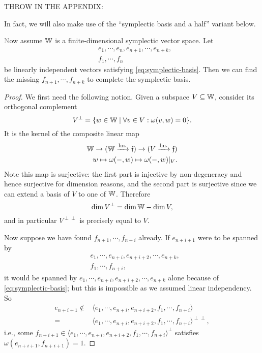 \color{gray}THROW IN THE APPENDIX: 

In fact, we will also make use of the ``symplectic basis and a half'' variant below. 
\begin{proposition}\label{prop:symplectic-basis-and-a-half}\textcolor{gray}
    Now assume $\mathbb{W}$ is a finite-dimensional symplectic vector space.
    Let 
    \begin{align*} 
        &e_1, \cdots, e_n, e_{n+1}, \cdots, e_{n+k}, \\
        &f_1, \cdots, f_n
    \end{align*}
    be linearly independent vectors satisfying \eqref{eq:symplectic-basis}.
    Then we can find the missing $f_{n+1}, \cdots, f_{n+k}$ to complete the symplectic basis.
\end{proposition}
\begin{proof}
    We first need the following notion.
    Given a subspace $V \subseteq \mathbb{W}$, consider its orthogonal complement
    \[
        V^\perp = \{ w \in \mathbb{W} \mid \forall v \in V : \omega(v, w) = 0 \}.
    \]
    It is the kernel of the composite linear map 
    \begin{align*}
        \mathbb{W} \to (\mathbb{W} \xrightarrow{\text{lin.}} \mathfrak{f}) \to (V \xrightarrow{\text{lin.}} \mathfrak{f}) \\
        w \mapsto \omega(-, w) \mapsto \omega(-, w)|_V.
    \end{align*}
    Note this map is surjective:
    the first part is injective by non-degeneracy and hence surjective for dimension reasons,
    and the second part is surjective since we can extend a basis of $V$ to one of $\mathbb{W}$.
    Therefore 
    \[
        \dim V^\perp = \dim \mathbb{W} - \dim V,
    \]
    and in particular $V^{\perp \perp}$ is precisely equal to $V$.

    Now suppose we have found $f_{n+1}, \cdots, f_{n+i}$ already.
    If $e_{n+i+1}$ were to be spanned by 
    \begin{align*}
        &e_1, \cdots, e_{n+i}, e_{n+i+2}, \cdots, e_{n+k},\\ 
        &f_1, \cdots, f_{n+i},
    \end{align*}
    it would be spanned by $e_1, \cdots, e_{n+i}, e_{n+i+2}, \cdots, e_{n+k}$ alone because of \eqref{eq:symplectic-basis};
    but this is impossible as we assumed linear independency.
    So 
    \begin{align*}
        e_{n+i+1} 
        \not\in{} &\langle e_1, \cdots, e_{n+i}, e_{n+i+2}, f_1, \cdots, f_{n+i} \rangle \\
        ={} &\langle e_1, \cdots, e_{n+i}, e_{n+i+2}, f_1, \cdots, f_{n+i} \rangle^{\perp \perp},
    \end{align*}
    i.e., some $f_{n+i+1} \in \langle e_1, \cdots, e_{n+i}, e_{n+i+2}, f_1, \cdots, f_{n+i} \rangle^\perp$ satisfies $\omega(e_{n+i+1}, f_{n+i+1}) = 1$.
\end{proof}

